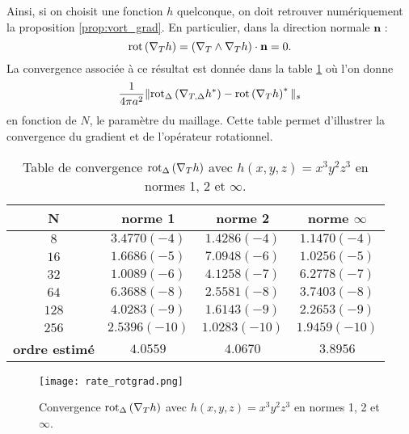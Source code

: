 Ainsi, si on choisit une fonction $h$ quelconque, on doit retrouver numériquement la proposition \ref{prop:vort_grad}. En particulier, dans la direction normale $\mathbf{n}$ : 
\begin{equation}
\text{rot}\left( \nabla_T h \right) = \left( \nabla_T \wedge \nabla_T h \right) \cdot \mathbf{n} = 0.
\label{eq:rot_grad}
\end{equation}
La convergence associée à ce résultat est donnée dans la table \ref{tab:rate_rotgrad} où l'on donne
\begin{equation}
\dfrac{1}{4 \pi a^2} \| \text{rot}_{\Delta} \left( \nabla_{T,\Delta} h^* \right) - \text{rot} \left( \nabla_{T} h \right)^* \|_s
\end{equation}
en fonction de $N$, le paramètre du maillage.
Cette table permet d'illustrer la convergence du gradient et de l'opérateur rotationnel.

\begin{table}[htbp]
\begin{center}
\begin{tabular}{|c||c|c|c|}
\hline
\textbf{N}  & \textbf{norme 1} & \textbf{norme 2} & \textbf{norme $\infty$} \\
\hline
\hline
$8$  & $3.4770(-4)$  & $1.4286(-4)$  & $1.1470(-4)$  \\
$16$ & $1.6686(-5)$  & $7.0948(-6)$  & $1.0256(-5)$  \\
$32$ & $1.0089(-6)$  & $4.1258(-7)$  & $6.2778(-7)$  \\
$64$ & $6.3688(-8)$  & $2.5581(-8)$  & $3.7403(-8)$  \\
$128$& $4.0283(-9)$  & $1.6143(-9)$  & $2.2653(-9)$  \\
$256$& $2.5396(-10)$ & $1.0283(-10)$ & $1.9459(-10)$ \\
\hline 
\hline
\textbf{ordre estimé}& $4.0559$ & $4.0670$ & $3.8956$\\
\hline
\end{tabular}
\end{center}
\caption{Table de convergence $\text{rot}_{\Delta} \left(\nabla_T h \right)$ avec $ h(x,y,z)=x^3 y^2 z^3$ en normes 1, 2 et $\infty$.}
\label{tab:rate_rotgrad}
\end{table} 

\begin{figure}[htbp]
\begin{center}
\texttt{[image: rate\_rotgrad.png]}
\end{center}
\caption{Convergence $\text{rot}_{\Delta} \left(\nabla_T h \right)$ avec $ h(x,y,z)=x^3 y^2 z^3$ en normes 1, 2 et $\infty$.}
\label{fig:rate_rotgrad}
\end{figure}
















